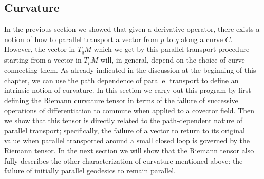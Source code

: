 
\subsection{Curvature}\label{sec:3.2}

In the previous section we showed that given a derivative operator, there exists a
notion of how to parallel transport a vector from $p$ to $q$ along a curve $C$. However,
the vector in $T_qM$ which we get by this parallel transport procedure starting from a
vector in $T_pM$ will, in general, depend on the choice of curve connecting them. As
already indicated in the discussion at the beginning of this chapter, we can use the
path dependence of parallel transport to define an intrinsic notion of curvature. In this
section we carry out this program by first defining the Riemann curvature tensor in
terms of the failure of successive operations of differentiation to commute when
applied to a covector field. Then we show that this tensor is directly related to the
path-dependent nature of parallel transport; specifically, the failure of a vector to
return to its original value when parallel transported around a small closed loop is
governed by the Riemann tensor. In the next section we will show that the Riemann
tensor also fully describes the other characterization of curvature mentioned above:
the failure of initially parallel geodesics to remain parallel.

